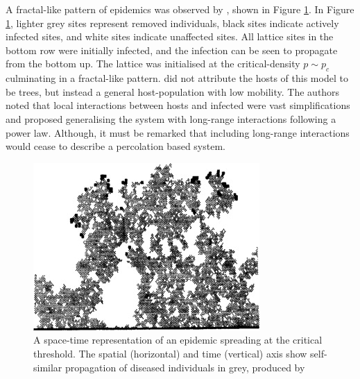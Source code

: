 A fractal-like pattern of epidemics was observed by \cite{GRASSBERGER1986273}, shown in Figure \ref{fig:1d_perc_basis}. 
In Figure \ref{fig:1d_perc_basis}, lighter grey sites represent removed individuals, 
black sites indicate actively infected sites, and white sites indicate unaffected sites. 
All lattice sites in the bottom row were initially infected, and the infection can be seen to propagate
from the bottom up. The lattice was initialised at the critical-density $p\sim p_c$ culminating in a fractal-like pattern.
\cite{GRASSBERGER1986273} did not attribute the hosts of this model to be trees, but instead a general host-population with low mobility. 
The authors noted that local interactions between hosts and infected were vast simplifications and proposed 
generalising the system with long-range interactions following a power law. 
Although, it must be remarked that including long-range interactions would cease to describe a percolation based system.

\begin{figure}
    \centering
    \includegraphics{chapter2/figures/perc1.jpg}
    \caption{A space-time representation of an epidemic spreading at the critical threshold. 
    The spatial (horizontal) and time (vertical) axis show self-similar propagation of diseased 
    individuals in grey, produced by \cite{GRASSBERGER1986273}}
    \label{fig:1d_perc_basis}
\end{figure}

